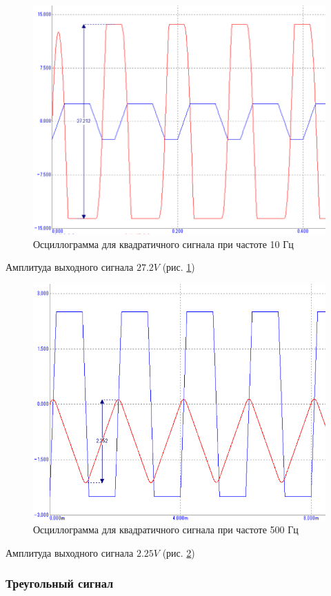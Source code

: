 \documentclass[a4paper,14pt]{article}
\begin{document}
\begin{figure}[H]
	\centering
	\includegraphics[width=0.7\linewidth]{../imgs/tran_square_10Hz}
	\caption{Осциллограмма для квадратичного сигнала при частоте 10 Гц}
	\label{fig:tran_square_10Hz}
\end{figure}

Амплитуда выходного сигнала $27.2V$ (рис. \ref{fig:tran_square_10Hz})

\begin{figure}[H]
	\centering
	\includegraphics[width=0.7\linewidth]{../imgs/tran_square_500Hz}
	\caption{Осциллограмма для квадратичного сигнала при частоте 500 Гц}
	\label{fig:tran_square_500Hz}
\end{figure}

Амплитуда выходного сигнала $2.25V$ (рис. \ref{fig:tran_square_500Hz})

\subsubsection{Треугольный сигнал}
\end{document}
